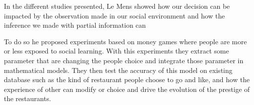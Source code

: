 \documentclass[10pt,letterpaper]{article}
\begin{document}
In the different studies presented, Le Mens showed how our decision can be impacted by the observation made in our social environment and how the inference we made with partial information can 

To do so he proposed experiments based on money games where people are more or less exposed to social learning. With this experiments they extract some parameter that are changing the people choice and integrate those parameter in mathematical models. They then test the accuracy of this model on existing database such as the kind of restaurant people choose to go and like, and how the experience of other can modify or choice and drive the evolution of the prestige of the restaurants.

%
%
%
%
\end{document}
